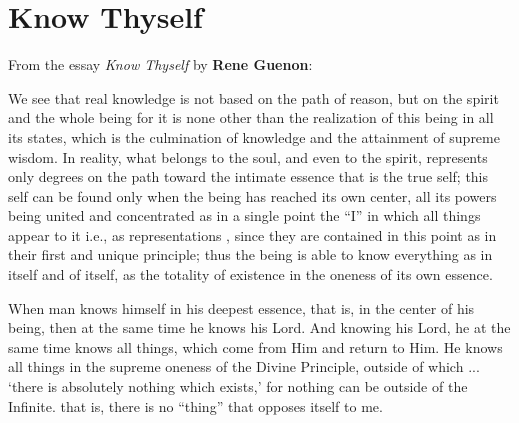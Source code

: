 \section{Know Thyself}

From the essay \emph{Know Thyself} by \textbf{Rene Guenon}:

\begin{quotationx}
We see that real knowledge is not based on the path of reason, but on the spirit and the whole being for it is none other than the realization of this being in all its states, which is the culmination of knowledge and the attainment of supreme wisdom. In reality, what belongs to the soul, and even to the spirit, represents only degrees on the path toward the intimate essence that is the true self; this self can be found only when the being has reached its own center, all its powers being united and concentrated as in a single point the ``I'' in which all things appear to it i.e., as representations , since they are contained in this point as in their first and unique principle; thus the being is able to know everything as in itself and of itself, as the totality of existence in the oneness of its own essence.

When man knows himself in his deepest essence, that is, in the center of his being, then at the same time he knows his Lord. And knowing his Lord, he at the same time knows all things, which come from Him and return to Him. He knows all things in the supreme oneness of the Divine Principle, outside of which ... `there is absolutely nothing which exists,' for nothing can be outside of the Infinite. that is, there is no ``thing'' that opposes itself to me. 
\end{quotationx}




